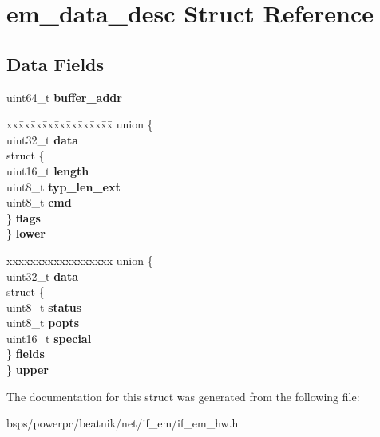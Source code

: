 \hypertarget{structem__data__desc}{}\section{em\+\_\+data\+\_\+desc Struct Reference}
\label{structem__data__desc}
\subsection*{Data Fields}
\begin{DoxyCompactItemize}
\item 
\mbox{\label{structem__data__desc_a0cda49071ab11ec194150bde45fcfe40}} 
uint64\+\_\+t {\bfseries buffer\+\_\+addr}
\item 
\mbox{\label{structem__data__desc_ab5a4f5c5a7b1ca2fbf6cbb0d82a7fa00}} 
\begin{tabbing}
xx\=xx\=xx\=xx\=xx\=xx\=xx\=xx\=xx\=\kill
union \{\\
\>uint32\_t {\bfseries data}\\
\>struct \{\\
\>\>uint16\_t {\bfseries length}\\
\>\>uint8\_t {\bfseries typ\_len\_ext}\\
\>\>uint8\_t {\bfseries cmd}\\
\>\} {\bfseries flags}\\
\} {\bfseries lower}\\

\end{tabbing}\item 
\mbox{\label{structem__data__desc_a0b1453c111be41a8c739c05fe0c39158}} 
\begin{tabbing}
xx\=xx\=xx\=xx\=xx\=xx\=xx\=xx\=xx\=\kill
union \{\\
\>uint32\_t {\bfseries data}\\
\>struct \{\\
\>\>uint8\_t {\bfseries status}\\
\>\>uint8\_t {\bfseries popts}\\
\>\>uint16\_t {\bfseries special}\\
\>\} {\bfseries fields}\\
\} {\bfseries upper}\\

\end{tabbing}\end{DoxyCompactItemize}


The documentation for this struct was generated from the following file\+:\begin{DoxyCompactItemize}
\item 
bsps/powerpc/beatnik/net/if\+\_\+em/if\+\_\+em\+\_\+hw.\+h\end{DoxyCompactItemize}
